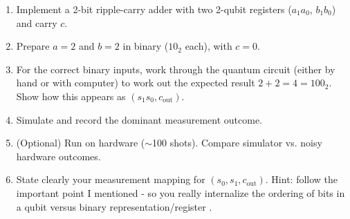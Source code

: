 \documentclass[11pt]{article}
\begin{document}
\begin{enumerate}[label=(\alph*)]
  \item Implement a 2-bit ripple-carry adder with two 2-qubit registers ($a_1a_0$, $b_1b_0$) and carry $c$.
  \item Prepare $a=2$ and $b=2$ in binary ($10_2$ each), with $c=0$.
  \item For the correct binary inputs, work through the quantum circuit (either by hand or with computer) to work out the expected result $2+2=4=100_2$. Show how this appears as $(s_1s_0,c_{\text{out}})$.
  \item Simulate and record the dominant measurement outcome.
  \item (Optional) Run on hardware ($\sim$100 shots). Compare simulator vs. noisy hardware outcomes.
  \item State clearly your measurement mapping for $(s_0,s_1,c_{\text{out}})$. Hint: follow the important point I mentioned  - so you really internalize the ordering of bits in a qubit versus binary representation/register \smiley{}.
\end{enumerate}
\end{document}
